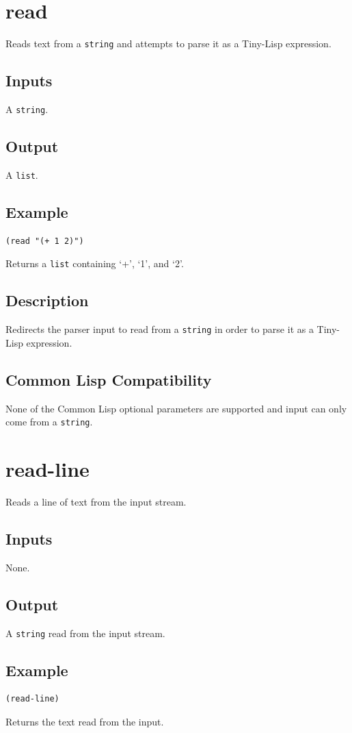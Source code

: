 \documentclass[10pt, openany]{book}
\newcommand{\datatype}[1]{\texttt{#1}}
\newcommand{\tl}{Tiny-Lisp}
\newcommand{\cl}{Common Lisp}
\begin{document}
\section{read}
Reads text from a \datatype{string} and attempts to parse it as a \tl{} expression.
\subsection{Inputs}
A \datatype{string}.
\subsection{Output}
A \datatype{list}.
\subsection{Example}
\begin{lstlisting}
(read "(+ 1 2)")
\end{lstlisting}
Returns a \datatype{list} containing `+', `1', and `2'.
\subsection{Description}
Redirects the parser input to read from a \datatype{string} in order to parse it as a \tl{} expression.
\subsection{Common Lisp Compatibility}
None of the \cl{} optional parameters are supported and input can only come from a \datatype{string}.

\section{read-line}
Reads a line of text from the input stream.
\subsection{Inputs}
None.
\subsection{Output}
A \datatype{string} read from the input stream.
\subsection{Example}
\begin{lstlisting}
(read-line)
\end{lstlisting}
Returns the text read from the input.
\end{document}
